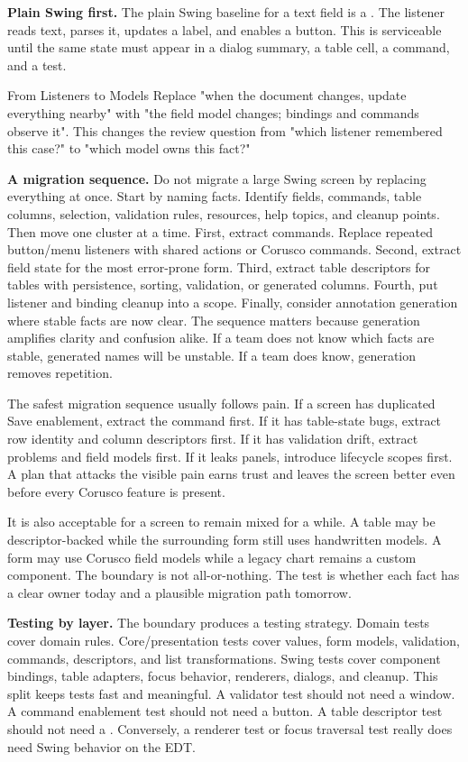 \textbf{Plain Swing first.} The plain Swing baseline for a text field is a . The listener reads text, parses it, updates a label, and enables a button. This is serviceable until the same state must appear in a dialog summary, a table cell, a command, and a test.

\begin{migrationbox}{From Listeners to Models}
Replace "when the document changes, update everything nearby" with "the field model changes; bindings and commands observe it". This changes the review question from "which listener remembered this case?" to "which model owns this fact?"
\end{migrationbox}

\textbf{A migration sequence.} Do not migrate a large Swing screen by replacing everything at once. Start by naming facts. Identify fields, commands, table columns, selection, validation rules, resources, help topics, and cleanup points. Then move one cluster at a time. First, extract commands. Replace repeated button/menu listeners with shared actions or Corusco commands. Second, extract field state for the most error-prone form. Third, extract table descriptors for tables with persistence, sorting, validation, or generated columns. Fourth, put listener and binding cleanup into a scope. Finally, consider annotation generation where stable facts are now clear. The sequence matters because generation amplifies clarity and confusion alike. If a team does not know which facts are stable, generated names will be unstable. If a team does know, generation removes repetition.

The safest migration sequence usually follows pain. If a screen has duplicated Save enablement, extract the command first. If it has table-state bugs, extract row identity and column descriptors first. If it has validation drift, extract problems and field models first. If it leaks panels, introduce lifecycle scopes first. A plan that attacks the visible pain earns trust and leaves the screen better even before every Corusco feature is present.

It is also acceptable for a screen to remain mixed for a while. A table may be descriptor-backed while the surrounding form still uses handwritten models. A form may use Corusco field models while a legacy chart remains a custom component. The boundary is not all-or-nothing. The test is whether each fact has a clear owner today and a plausible migration path tomorrow.

\textbf{Testing by layer.} The boundary produces a testing strategy. Domain tests cover domain rules. Core/presentation tests cover values, form models, validation, commands, descriptors, and list transformations. Swing tests cover component bindings, table adapters, focus behavior, renderers, dialogs, and cleanup. This split keeps tests fast and meaningful. A validator test should not need a window. A command enablement test should not need a button. A table descriptor test should not need a . Conversely, a renderer test or focus traversal test really does need Swing behavior on the EDT.

